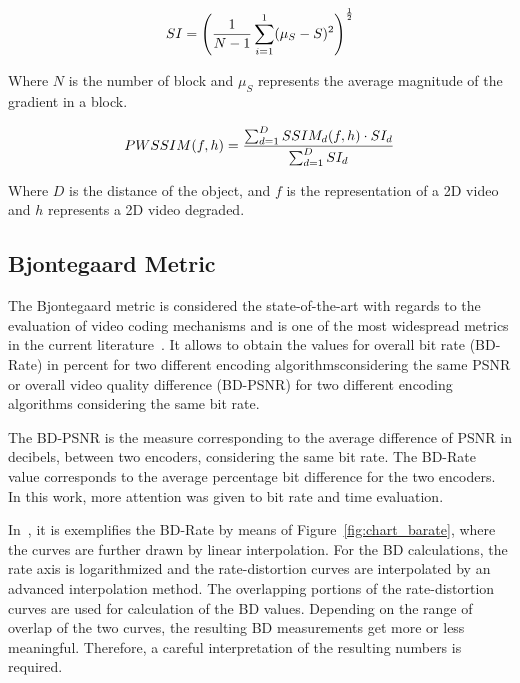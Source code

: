 \documentclass[journal]{IEEEtran}
\begin{document}

\begin{equation}
	\centering
	\label{si}
	SI = \left ( \frac{1}{N-1}\sum_{i=1}^{1}(\mu_{S}-S)^{2} \right )^{\frac{1}{2}}
\end{equation}

Where $N$ is the number of block and $\mu_{S}$ represents the average magnitude of the gradient in a block.

\begin{equation}
	\centering
	\label{pwssim}
	PWSSIM(f,h)= \frac{\sum_{d=1}^{D}SSIM_{d}(f,h)\cdot SI_{d}}{\sum_{d=1}^{D}SI_{d}}		
\end{equation}

Where $D$ is the distance of the object, and $f$ is the representation of a 2D video and $h$ represents a 2D video degraded.


\subsection{Bjontegaard Metric}

The Bjontegaard metric is considered the state-of-the-art with regards to the evaluation of video coding mechanisms and is one of the most widespread metrics in the current literature~\cite{Bjontegaard:01}\cite{Mathias}. It allows to obtain the values for overall bit rate (BD-Rate) in percent for two different encoding algorithmsconsidering the same PSNR or overall video quality difference (BD-PSNR) for two different encoding algorithms considering the same bit rate. %
	
The BD-PSNR is the measure corresponding to the average difference of PSNR in decibels, between two encoders, considering the same bit rate. The BD-Rate value corresponds to the average percentage bit difference for the two encoders. In this work, more attention was given to bit rate and time evaluation.	

In~\cite{Mathias}, it is exemplifies the BD-Rate by means of Figure~\ref{fig:chart_barate}, where the curves are further drawn by linear interpolation. For the BD calculations, the rate axis is logarithmized and the rate-distortion curves are interpolated by an advanced interpolation method. The overlapping portions of the rate-distortion curves are used for calculation of the BD values. Depending on the range of overlap of the two curves, the resulting BD measurements get more or less meaningful. Therefore, a careful interpretation of the resulting numbers is required.
\end{document}
